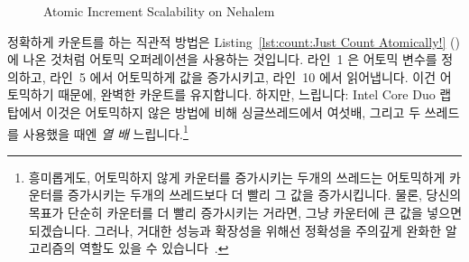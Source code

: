 \begin{figure}[tb]
\centering
{}
\caption{Atomic Increment Scalability on Nehalem}
\label{fig:count:Atomic Increment Scalability on Nehalem}
\end{figure}

정확하게 카운트를 하는 직관적 방법은
Listing~\ref{lst:count:Just Count Atomically!} ()
에 나온 것처럼 어토믹 오퍼레이션을 사용하는 것입니다.
라인~1 은 어토믹 변수를 정의하고, 라인~5 에서 어토믹하게 값을 증가시키고,
라인~10 에서 읽어냅니다.
이건 어토믹하기 때문에, 완벽한 카운트를 유지합니다.
하지만, 느립니다: Intel Core Duo 랩탑에서 이것은 어토믹하지 않은 방법에 비해
싱글쓰레드에서 여섯배, 그리고 두 쓰레드를 사용했을 때엔 \emph{열 배}
느립니다.\footnote{
	흥미롭게도, 어토믹하지 않게 카운터를 증가시키는 두개의 쓰레드는
	어토믹하게 카운터를 증가시키는 두개의 쓰레드보다 더 빨리 그 값을
	증가시킵니다.
	물론, 당신의 목표가 단순히 카운터를 더 빨리 증가시키는 거라면, 그냥
	카운터에 큰 값을 넣으면 되겠습니다.
	그러나, 거대한 성능과 확장성을 위해선 정확성을 주의깊게 완화한
	알고리즘의 역할도 있을 수
	있습니다~\cite{Andrews91textbook,Arcangeli03,DavidUngar2011unsync}.}
\iffalse

